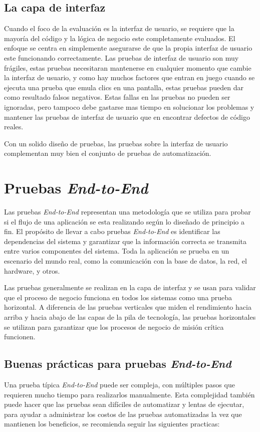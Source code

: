\subsection{La capa de interfaz}
Cuando el foco de la evaluación es la interfaz de usuario, se requiere que la
mayoría del código y la lógica de negocio este completamente evaluados. El
enfoque se centra en simplemente asegurarse de que la propia interfaz de
usuario este funcionando correctamente. Las pruebas de interfaz de usuario son
muy frágiles, estas pruebas necesitaran mantenerse en cualquier momento que
cambie la interfaz de usuario, y como hay muchos factores que entran en juego
cuando se ejecuta una prueba que emula clics en una pantalla, estas pruebas
pueden dar como resultado falsos negativos. Estas fallas en las pruebas no
pueden ser ignoradas, pero tampoco debe gastarse mas tiempo en solucionar los
problemas y mantener las pruebas de interfaz de usuario que en encontrar
defectos de código reales.

Con un solido diseño de pruebas, las pruebas sobre la interfaz de usuario
complementan muy bien el conjunto de pruebas de automatización.

\section{Pruebas \emph{End-to-End}}
Las pruebas \emph{End-to-End} representan una metodología que se utiliza para
probar si el flujo de una aplicación se esta realizando según lo diseñado de
principio a fin. El propósito de llevar a cabo pruebas \emph{End-to-End} es
identificar las dependencias del sistema y garantizar que la información
correcta se transmita entre varios componentes del sistema. Toda la aplicación
se prueba en un escenario del mundo real, como la comunicación con la base de
datos, la red, el hardware, y otros.

Las pruebas generalmente se realizan en la capa de interfaz y se usan para
validar que el proceso de negocio funciona en todos los sistemas como una
prueba horizontal. A diferencia de las pruebas verticales que miden el
rendimiento hacia arriba y hacia abajo de las capas de la pila de tecnología,
las pruebas horizontales se utilizan para garantizar que los procesos de negocio
de misión crítica funcionen.

\subsection{Buenas prácticas para pruebas \emph{End-to-End}}
Una prueba típica \emph{End-to-End} puede ser compleja, con múltiples pasos que
requieren mucho tiempo para realizarlos manualmente. Esta complejidad también
puede hacer que las pruebas sean difíciles de automatizar y lentas de ejecutar,
para ayudar a administrar los costos de las pruebas automatizadas  la vez que
mantienen los beneficios, se recomienda seguir las siguientes practicas:

